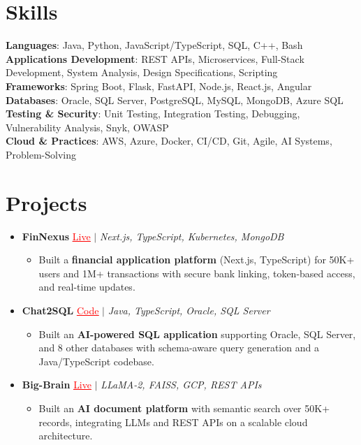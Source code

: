 \documentclass[letterpaper,10pt]{article}
\newcommand{\resumeItem}[1]{\item\small{{#1 \vspace{-2pt}}}}
\newcommand{\resumeProjectHeading}[1]{\item \small #1 \vspace{-2pt}}
\newcommand{\resumeSubHeadingListStart}{\begin{itemize}[leftmargin=0.0in, label={}]}
\newcommand{\resumeSubHeadingListEnd}{\end{itemize}}
\newcommand{\resumeProjItemListStart}{\begin{itemize}[leftmargin=0.15in,label=\textbullet,itemsep=0pt,topsep=0pt,parsep=0pt,partopsep=0pt]}
\newcommand{\resumeProjItemListEnd}{\end{itemize}\vspace{-4pt}}
\begin{document}
\section{Skills}
\begin{itemize}[leftmargin=0.15in, label={}]
\small{\item{
\textbf{Languages}: Java, Python, JavaScript/TypeScript, SQL, C++, Bash \\
\textbf{Applications Development}: REST APIs, Microservices, Full-Stack Development, System Analysis, Design Specifications, Scripting \\
\textbf{Frameworks}: Spring Boot, Flask, FastAPI, Node.js, React.js, Angular \\
\textbf{Databases}: Oracle, SQL Server, PostgreSQL, MySQL, MongoDB, Azure SQL \\
\textbf{Testing \& Security}: Unit Testing, Integration Testing, Debugging, Vulnerability Analysis, Snyk, OWASP \\
\textbf{Cloud \& Practices}: AWS, Azure, Docker, CI/CD, Git, Agile, AI Systems, Problem-Solving
}}
\end{itemize}
\vspace{-6pt}
\section{Projects}
\resumeSubHeadingListStart
\vspace{-2pt}
\resumeProjectHeading{\textbf{FinNexus} {\href{https://fin-nexus.vercel.app/}{\textcolor{red}{\underline{Live}}}} $|$ \emph{Next.js, TypeScript, Kubernetes, MongoDB}}
\resumeProjItemListStart
\resumeItem{Built a \textbf{financial application platform} (Next.js, TypeScript) for 50K+ users and 1M+ transactions with secure bank linking, token-based access, and real-time updates.}
\resumeProjItemListEnd
\vspace{3pt}
\resumeProjectHeading{\textbf{Chat2SQL} {\href{https://github.com/SAHAJ-BHADJA/Chat2SQL}{\textcolor{red}{\underline{Code}}}} $|$ \emph{Java, TypeScript, Oracle, SQL Server}}
\resumeProjItemListStart
\resumeItem{Built an \textbf{AI-powered SQL application} supporting Oracle, SQL Server, and 8 other databases with schema-aware query generation and a Java/TypeScript codebase.}
\resumeProjItemListEnd
\vspace{3pt}
\resumeProjectHeading{\textbf{Big-Brain} {\href{https://big-brain-pied.vercel.app/}{\textcolor{red}{\underline{Live}}}} $|$ \emph{LLaMA-2, FAISS, GCP, REST APIs}}
\resumeProjItemListStart
\resumeItem{Built an \textbf{AI document platform} with semantic search over 50K+ records, integrating LLMs and REST APIs on a scalable cloud architecture.}
\resumeProjItemListEnd
\resumeSubHeadingListEnd
\end{document}

